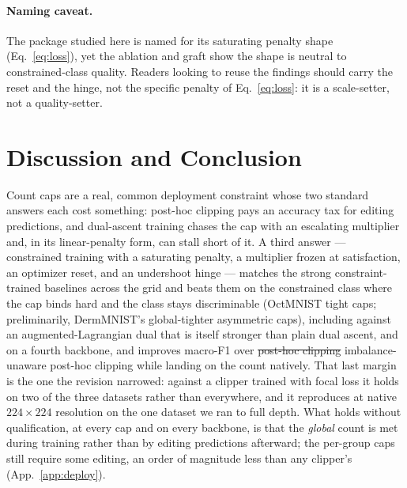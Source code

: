 \documentclass[10pt]{article}
\newcommand{\del}[1]{{\color{red}\sout{#1}}}
\begin{document}
\paragraph{Naming caveat.}
The package studied here is named for its saturating penalty shape
(Eq.~\eqref{eq:loss}), yet the ablation and graft show the shape is
neutral to constrained-class quality. Readers looking to reuse the
findings should carry the reset and the hinge, not the specific penalty
of Eq.~\eqref{eq:loss}: it is a scale-setter, not a quality-setter.

\section{Discussion and Conclusion}
\label{sec:conclusion}

Count caps are a real, common deployment constraint whose two standard
answers each cost something: post-hoc clipping pays an accuracy tax for
editing predictions, and dual-ascent training chases the cap with an
escalating multiplier and, in its linear-penalty form, can stall short of
it. A third answer --- constrained training with a saturating penalty, a
multiplier frozen at satisfaction, an optimizer reset, and an undershoot
hinge --- matches the strong constraint-trained baselines across the grid
and beats them on the constrained class where the cap binds hard and the
class stays discriminable (OctMNIST tight caps; preliminarily,
DermMNIST's global-tighter asymmetric caps),{\color{blue} including against an
augmented-Lagrangian dual that is itself stronger than plain dual ascent, and on a
fourth backbone,} and improves macro-F1 over
\del{post-hoc clipping}{\color{blue} imbalance-unaware post-hoc clipping}
while landing on the count natively.{\color{blue} That last margin is the one the
revision narrowed: against a clipper trained with focal loss it holds on two of the
three datasets rather than everywhere, and it reproduces at native
$224{\times}224$ resolution on the one dataset we ran to full depth. What holds
without qualification, at every cap and on every backbone, is that the
{\color{blue}\emph{global}} count is met
during training rather than by editing predictions afterward{\color{blue}; the
per-group caps still require some editing, an order of magnitude less than any
clipper's (App.~\ref{app:deploy})}.}
\end{document}

